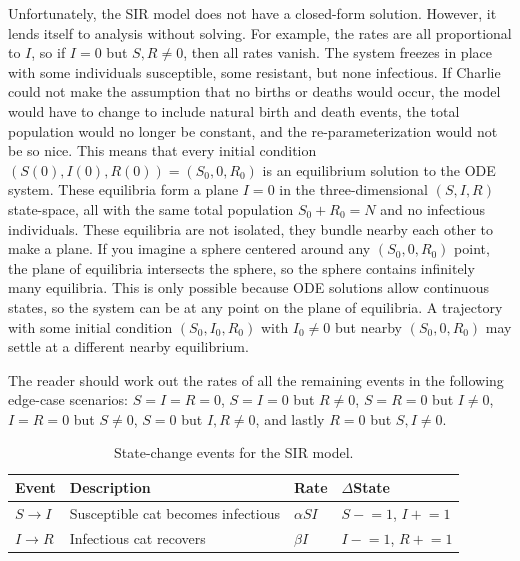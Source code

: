 \begin{example}
Unfortunately, the SIR model does not have a closed-form solution.
However, it lends itself to analysis without solving.
For example, the rates are all proportional to $I$, so if $I = 0$ but $S, R \neq 0$, then all rates vanish. The system freezes in place with some individuals susceptible, some resistant, but none infectious.
If Charlie could not make the assumption that no births or deaths would occur, the model would have to change to include natural birth and death events, the total population would no longer be constant, and the re-parameterization would not be so nice.
This means that every initial condition $(S(0), I(0), R(0)) = (S_0, 0, R_0)$ is an equilibrium solution to the ODE system.
These equilibria form a plane $I = 0$ in the three-dimensional $(S, I, R)$ state-space, all with the same total population $S_0 + R_0 = N$ and no infectious individuals.
These equilibria are not isolated, they bundle nearby each other to make a plane.
If you imagine a sphere centered around any $(S_0, 0, R_0)$ point, the plane of equilibria intersects the sphere, so the sphere contains infinitely many equilibria.
This is only possible because ODE solutions allow continuous states, so the system can be at any point on the plane of equilibria.
A trajectory with some initial condition $(S_0, I_0, R_0)$ with $I_0 \neq 0$ but nearby $(S_0, 0, R_0)$ may settle at a different nearby equilibrium.

The reader should work out the rates of all the remaining events in the following edge-case scenarios: $S = I = R = 0$, $S = I = 0$ but $R \neq 0$, $S = R = 0$ but $I \neq 0$, $I = R = 0$ but $S \neq 0$, $S = 0$ but $I, R \neq 0$, and lastly $R = 0$ but $S, I \neq 0$.\\

\begin{table}[htbp]
\centering
\caption{State-change events for the SIR model.}\label{tab:sir_events}
\begin{tabular}{llll}
\hline
Event & Description & Rate & $\Delta$State \\
\hline
$S \to I$ & Susceptible cat becomes infectious & $\alpha SI$ & $S \mathrel{-}= 1$, $I \mathrel{+}= 1$ \\
$I \to R$ & Infectious cat recovers & $\beta I$ & $I \mathrel{-}= 1$, $R \mathrel{+}= 1$ \\
\hline
\end{tabular}
\end{table}

\end{example}

